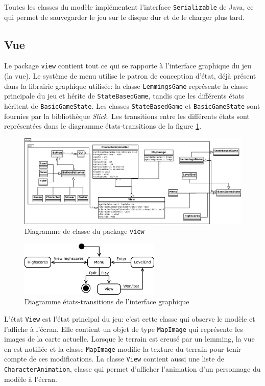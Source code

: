 \documentclass[a4paper,12pt]{article}
\begin{document}
Toutes les classes du modèle implémentent l'interface
\texttt{Serializable} de Java, ce qui permet de sauvegarder le jeu sur
le disque dur et de le charger plus tard.
\subsection{Vue}
Le package \texttt{view} contient tout ce qui se rapporte à
l'interface graphique du jeu (la vue). Le système de menu utilise le
patron de conception d'état, déjà présent dans la librairie graphique
utilisée: la classe \texttt{LemmingsGame} représente la classe
principale du jeu et hérite de \texttt{StateBasedGame}, tandis que les
différents états héritent de \texttt{BasicGameState}. Les
classes \texttt{StateBasedGame} et \texttt{BasicGameState} sont
fournies par la bibliothèque \emph{Slick}. Les transitions entre les
différents états sont représentées dans le diagramme états-transitions
de la figure \ref{fig:Etats}.

\begin{figure}[ht!]
  \centerline{
  \includegraphics[width=\textwidth]{view.png}}
  \caption{Diagramme de classe du package \texttt{view}}
\end{figure}

\begin{figure}[ht!]
  \centerline{
  \includegraphics[width=0.6\textwidth]{state.png}}
  \caption{Diagramme états-transitions de l'interface graphique}
  \label{fig:Etats}
\end{figure}

L'état \texttt{View} est l'état principal du jeu: c'est cette classe
qui observe le modèle et l'affiche à l'écran. Elle contient un objet
de type \texttt{MapImage} qui représente les images de la carte
actuelle. Lorsque le terrain est creusé par un lemming, la vue en est
notifiée et la classe \texttt{MapImage} modifie la texture du terrain
pour tenir compte de ces modifications. La classe \texttt{View}
contient aussi une liste de \texttt{CharacterAnimation}, classe qui
permet d'afficher l'animation d'un personnage du modèle à l'écran.\\
\end{document}
